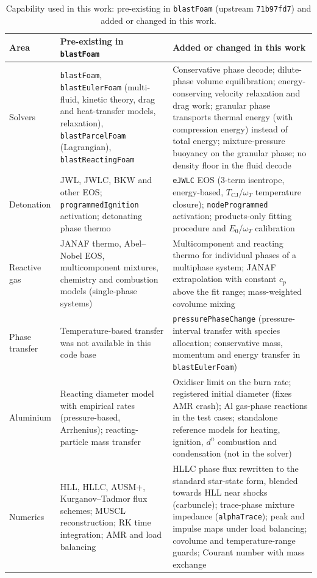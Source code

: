 \documentclass{article}
\begin{document}
\begin{table}[htbp]
    \centering
    \footnotesize
    \caption{Capability used in this work: pre-existing in \texttt{blastFoam} (upstream \texttt{71b97fd7}) and added or changed in this work.}
    \label{tab:provenance}
    \begin{tabularx}{\textwidth}{>{\raggedright\arraybackslash}p{3.0cm}>{\raggedright\arraybackslash}X>{\raggedright\arraybackslash}X}
        \toprule
        \textbf{Area} & \textbf{Pre-existing in \texttt{blastFoam}} & \textbf{Added or changed in this work} \\
        \midrule
        Solvers & \texttt{blastFoam}, \texttt{blastEulerFoam} (multi-fluid, kinetic theory, drag and heat-transfer models, relaxation), \texttt{blastParcelFoam} (Lagrangian), \texttt{blastReactingFoam} & Conservative phase decode; dilute-phase volume equilibration; energy-conserving velocity relaxation and drag work; granular phase transports thermal energy (with compression energy) instead of total energy; mixture-pressure buoyancy on the granular phase; no density floor in the fluid decode \\
        Detonation & JWL, JWLC, BKW and other EOS; \texttt{programmedIgnition} activation; detonating phase thermo & \texttt{eJWLC} EOS (3-term isentrope, energy-based, $T_\text{CJ}$/$\omega_T$ temperature closure); \texttt{nodeProgrammed} activation; products-only fitting procedure and $E_0$/$\omega_T$ calibration \\
        Reactive gas & JANAF thermo, Abel--Nobel EOS, multicomponent mixtures, chemistry and combustion models (single-phase systems) & Multicomponent and reacting thermo for individual phases of a multiphase system; JANAF extrapolation with constant $c_p$ above the fit range; mass-weighted covolume mixing \\
        Phase transfer & Temperature-based transfer was not available in this code base & \texttt{pressurePhaseChange} (pressure-interval transfer with species allocation; conservative mass, momentum and energy transfer in \texttt{blastEulerFoam}) \\
        Aluminium & Reacting diameter model with empirical rates (pressure-based, Arrhenius); reacting-particle mass transfer & Oxidiser limit on the burn rate; registered initial diameter (fixes AMR crash); Al gas-phase reactions in the test cases; standalone reference models for heating, ignition, $d^n$ combustion and condensation (not in the solver) \\
        Numerics & HLL, HLLC, AUSM+, Kurganov--Tadmor flux schemes; MUSCL reconstruction; RK time integration; AMR and load balancing & HLLC phase flux rewritten to the standard star-state form, blended towards HLL near shocks (carbuncle); trace-phase mixture impedance (\texttt{alphaTrace}); peak and impulse maps under load balancing; covolume and temperature-range guards; Courant number with mass exchange \\

\end{tabularx}
\end{table}
\end{document}
